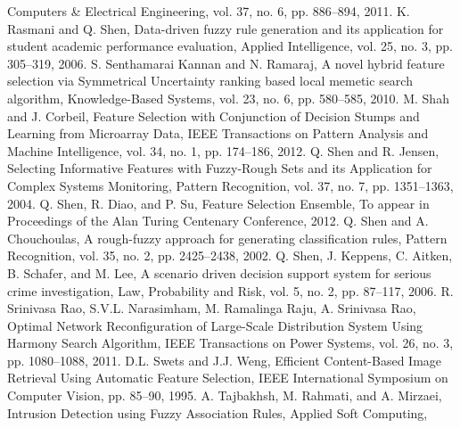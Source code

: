 Computers \& Electrical Engineering,
vol. 37, no. 6, pp. 886--894,
2011.
K. Rasmani and Q. Shen,
Data-driven fuzzy rule generation and its application for student academic performance evaluation,
Applied Intelligence,
vol. 25, no. 3, pp. 305--319,
2006.
S. Senthamarai Kannan and N. Ramaraj,
A novel hybrid feature selection via Symmetrical Uncertainty ranking based local memetic search algorithm,
Knowledge-Based Systems,
vol. 23, no. 6, pp. 580--585,
2010.
M. Shah and J. Corbeil,
Feature Selection with Conjunction of Decision Stumps and Learning from Microarray Data,
IEEE Transactions on Pattern Analysis and Machine Intelligence,
vol. 34, no. 1, pp. 174--186,
2012.
Q. Shen and R. Jensen,
Selecting Informative Features with Fuzzy-Rough Sets and its Application for Complex Systems Monitoring,
Pattern Recognition,
vol. 37, no. 7, pp. 1351--1363,
2004.
Q. Shen, R. Diao, and P. Su,
Feature Selection Ensemble,
To appear in Proceedings of the Alan Turing Centenary Conference,
2012.
Q. Shen and A. Chouchoulas,
A rough-fuzzy approach for generating classification rules,
Pattern Recognition,
vol. 35, no. 2, pp. 2425--2438,
2002.
Q. Shen, J. Keppens, C. Aitken, B. Schafer, and M. Lee,
A scenario driven decision support system for serious crime investigation,
Law, Probability and Risk,
vol. 5, no. 2, pp. 87--117,
2006.
R. Srinivasa Rao, S.V.L. Narasimham, M. Ramalinga Raju, A. Srinivasa Rao,
Optimal Network Reconfiguration of Large-Scale Distribution System Using Harmony Search Algorithm,
IEEE Transactions on Power Systems,
vol. 26, no. 3, pp. 1080--1088,
2011.
D.L. Swets and J.J. Weng,
Efficient Content-Based Image Retrieval Using Automatic Feature Selection,
IEEE International Symposium on Computer Vision,
pp. 85--90,
1995.
A. Tajbakhsh, M. Rahmati, and A. Mirzaei,
Intrusion Detection using Fuzzy Association Rules,
Applied Soft Computing,
